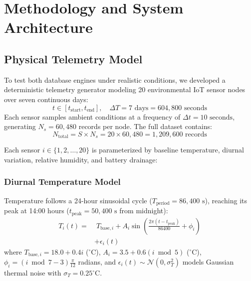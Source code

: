 \documentclass[conference,a4paper]{IEEEtran}
\begin{document}
\section{Methodology and System Architecture}

\subsection{Physical Telemetry Model}
To test both database engines under realistic conditions, we developed a deterministic telemetry generator modeling 20 environmental IoT sensor nodes over seven continuous days:
\begin{equation}
    t \in [t_{\mathrm{start}}, t_{\mathrm{end}}], \quad \Delta T = 7 \text{ days} = 604{,}800 \text{ seconds}
\end{equation}
Each sensor samples ambient conditions at a frequency of $\Delta t = 10\text{ seconds}$, generating $N_s = 60{,}480$ records per node. The full dataset contains:
\begin{equation}
    N_{\mathrm{total}} = S \times N_s = 20 \times 60{,}480 = 1{,}209{,}600 \text{ records}
\end{equation}

Each sensor $i \in \{1, 2, \dots, 20\}$ is parameterized by baseline temperature, diurnal variation, relative humidity, and battery drainage:

\subsubsection{Diurnal Temperature Model}
Temperature follows a 24-hour sinusoidal cycle ($T_{\mathrm{period}} = 86{,}400\text{ s}$), reaching its peak at 14:00 hours ($t_{\mathrm{peak}} = 50{,}400\text{ s}$ from midnight):
\begin{equation}
\begin{split}
    T_i(t) = &\; T_{\mathrm{base}, i} + A_i \sin\left(\frac{2\pi (t - t_{\mathrm{peak}})}{86400} + \phi_i\right) \\
    &+ \epsilon_i(t)
\end{split}
\end{equation}
where $T_{\mathrm{base}, i} = 18.0 + 0.4i$ ($^{\circ}\text{C}$), $A_i = 3.5 + 0.6(i \bmod 5)$ ($^{\circ}\text{C}$), $\phi_i = (i \bmod 7 - 3)\frac{\pi}{12}$ radians, and $\epsilon_i(t) \sim \mathcal{N}(0, \sigma_T^2)$ models Gaussian thermal noise with $\sigma_T = 0.25^{\circ}\text{C}$.
\end{document}
